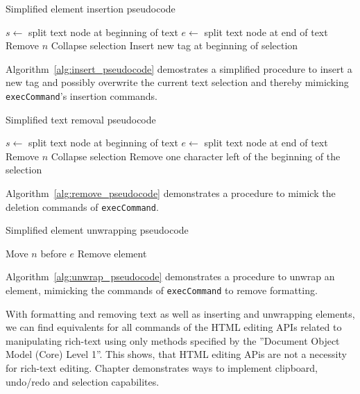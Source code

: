 \begin{algorithm}
\caption{Simplified element insertion pseudocode}
\label{alg:insert_pseudocode}
\begin{algorithmic}[1]
  \State $s \gets$ split text node at beginning of text
  \State $e \gets$ split text node at end of text
    \State Remove $n$
  \EndFor
  \State Collapse selection
\EndIf
\State Insert new tag at beginning of selection
\EndProcedure
\end{algorithmic}
\end{algorithm}

Algorithm~\ref{alg:insert_pseudocode} demostrates a simplified procedure to insert a new tag and possibly overwrite the current text selection and thereby mimicking \texttt{execCommand}'s insertion commands.

\begin{algorithm}
\caption{Simplified text removal pseudocode}
\label{alg:remove_pseudocode}
\begin{algorithmic}[1]
  \State $s \gets$ split text node at beginning of text
  \State $e \gets$ split text node at end of text
    \State Remove $n$
  \EndFor
  \State Collapse selection
\Else
  \State Remove one character left of the beginning of the selection
\EndIf
\EndProcedure
\end{algorithmic}
\end{algorithm}

Algorithm~\ref{alg:remove_pseudocode} demonstrates a procedure to mimick the deletion commands of \texttt{execCommand}.

\begin{algorithm}
\caption{Simplified element unwrapping pseudocode}
\label{alg:unwrap_pseudocode}
\begin{algorithmic}[1]
    \State Move $n$ before $e$
  \EndFor
\EndProcedure
\State Remove element
\end{algorithmic}
\end{algorithm}

Algorithm~\ref{alg:unwrap_pseudocode} demonstrates a procedure to unwrap an element, mimicking the commands of \texttt{execCommand} to remove formatting.

With formatting and removing text as well as inserting and unwrapping elements, we can find equivalents for all commands of the HTML editing APIs related to manipulating rich-text using only methods specified by the ''Document Object Model (Core) Level 1''. This shows, that HTML editing APis are not a necessity for rich-text editing. Chapter  demonstrates ways to implement clipboard, undo/redo and selection capabilites.

